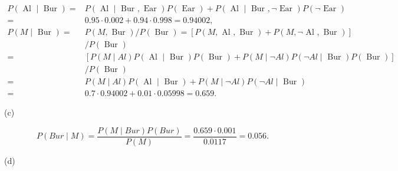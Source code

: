 \documentclass[10pt]{book}
\begin{document}
\begin{center}
\begin{enumerate}
\begin{center}
\begin{center}
\begin{center}
\begin{center}
\begin{center}
$$
\begin{aligned}
P(\text { Al } \mid \text { Bur })= & P(\text { Al } \mid \text { Bur }, \text { Ear }) P(\text { Ear })+P(\text { Al } \mid \text { Bur }, \neg \text { Ear }) P(\neg \text { Ear }) \\
= & 0.95 \cdot 0.002+0.94 \cdot 0.998=0.94002, \\
P(M \mid \text { Bur })= & P(M, \text { Bur }) / P(\text { Bur })=[P(M, \text { Al }, \text { Bur })+P(M, \neg \text { Al }, \text { Bur })] \\
& / P(\text { Bur }) \\
= & {[P(M \mid A l) P(\text { Al } \mid \text { Bur }) P(\text { Bur })+P(M \mid \neg A l) P(\neg A l \mid \text { Bur }) P(\text { Bur })] } \\
& / P(\text { Bur }) \\
= & P(M \mid A l) P(\text { Al } \mid \text { Bur })+P(M \mid \neg A l) P(\neg A l \mid \text { Bur }) \\
= & 0.7 \cdot 0.94002+0.01 \cdot 0.05998=0.659 .
\end{aligned}
$$

(c)

$$
P(B u r \mid M)=\frac{P(M \mid B u r) P(B u r)}{P(M)}=\frac{0.659 \cdot 0.001}{0.0117}=0.056 .
$$

(d)


\end{center}
\end{center}
\end{center}
\end{center}
\end{center}
\end{enumerate}
\end{center}
\end{document}
